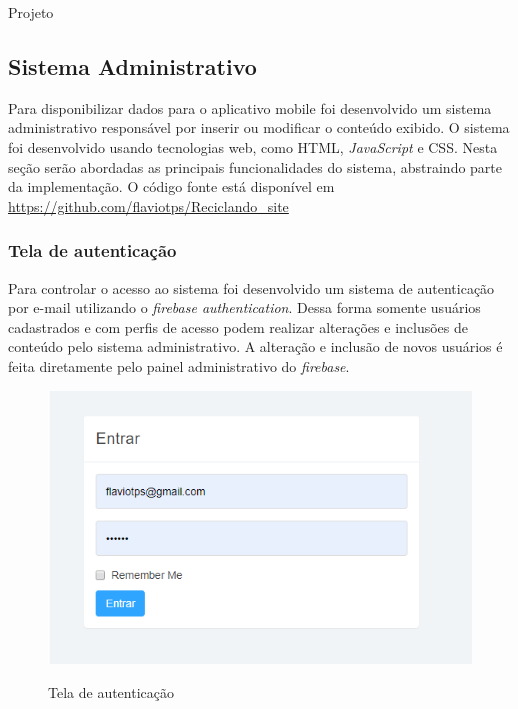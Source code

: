 \documentclass[
	12pt,				%
	openany,			%
	twoside,			%
	a4paper,			%
	english,			%
	french,				%
	spanish,			%
	brazil				%
	]{abntex2}
\begin{document}
\begin{chapter}{Projeto}
\newpage
\subsection{Sistema Administrativo} \label{Sistema Administrativo}
Para disponibilizar dados para o aplicativo mobile foi desenvolvido um sistema administrativo responsável por inserir ou modificar o conteúdo exibido. O sistema foi desenvolvido usando tecnologias web, como HTML, \textit{JavaScript} e CSS. Nesta seção serão abordadas as principais funcionalidades do sistema, abstraindo parte da implementação. O código fonte está disponível em \url{https://github.com/flaviotps/Reciclando_site}

\newpage
\subsubsection{Tela de autenticação} \label{tela_auth}
Para controlar o acesso ao sistema foi desenvolvido um sistema de autenticação por e-mail utilizando o \textit{firebase authentication}. Dessa forma somente usuários cadastrados e com perfis de acesso podem realizar alterações e inclusões de conteúdo pelo sistema administrativo. 
A alteração e inclusão de novos usuários é feita diretamente pelo painel administrativo do \textit{firebase}.


\begin{figure}[h]
\centering
   \caption{Tela de autenticação}
   \includegraphics[scale=0.85]{media/tela_login_site_1.png}
     \label{fig:tela_login_site_1}
\end{figure}


\end{chapter}
\end{document}
